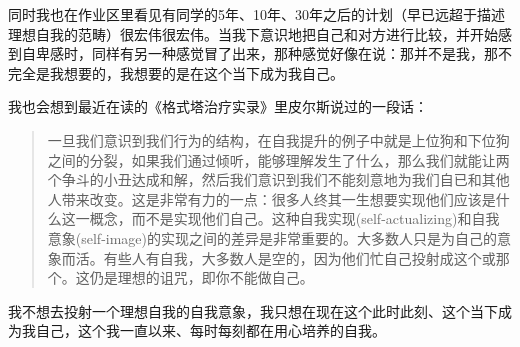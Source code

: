 同时我也在作业区里看见有同学的5年、10年、30年之后的计划（早已远超于描述理想自我的范畴）很宏伟很宏伟。当我下意识地把自己和对方进行比较，并开始感到自卑感时，同样有另一种感觉冒了出来，那种感觉好像在说：那并不是我，那不完全是我想要的，我想要的是在这个当下成为我自己。

我也会想到最近在读的《格式塔治疗实录》里皮尔斯说过的一段话：

\blockquote{一旦我们意识到我们行为的结构，在自我提升的例子中就是上位狗和下位狗之间的分裂，如果我们通过倾听，能够理解发生了什么，那么我们就能让两个争斗的小丑达成和解，然后我们意识到我们不能刻意地为我们自已和其他人带来改变。这是非常有力的一点：很多人终其一生想要实现他们应该是什么这一概念，而不是实现他们自己。这种自我实现(self-actualizing)和自我意象(self-image)的实现之间的差异是非常重要的。大多数人只是为自己的意象而活。有些人有自我，大多数人是空的，因为他们忙自己投射成这个或那个。这仍是理想的诅咒，即你不能做自己。}

我不想去投射一个理想自我的自我意象，我只想在现在这个此时此刻、这个当下成为我自己，这个我一直以来、每时每刻都在用心培养的自我。

